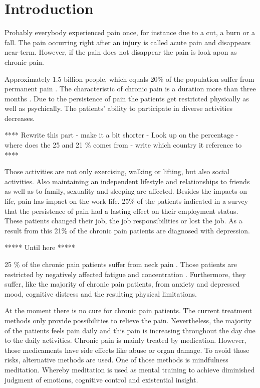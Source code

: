 \chapter{Introduction}

Probably everybody experienced pain once, for instance due to a cut, a burn or a fall. The pain occurring right after an injury is called acute pain and disappears near-term. However, if the pain does not disappear the pain is look apon as chronic pain. \cite{Briggs2010,Mello2016}

Approximately 1.5 billion people, which equals 20\% of the population suffer from permanent pain \cite{Zeidan2016,Macfarlanea2016}. The characteristic of chronic pain is a duration more than three months \cite{Mello2016}. Due to the persistence of pain the patients get restricted physically as well as psychically. 
The patients' ability to participate in diverse activities decreases. 

**** Rewrite this part - make it a bit shorter - Look up on the percentage - where does the 25 and 21 \% comes from - write which country it reference to ****
 
Those activities are not only exercising, walking or lifting, but also social activities. Also maintaining an independent lifestyle and relationships to friends as well as to family, sexuality and sleeping are affected. Besides the impacts on life, pain has impact on the work life. 25\% of the patients indicated in a survey that the persistence of pain had a lasting effect on their employment status. These patients changed their job, the job responsibilities or lost the job. 
As a result from this 21\% of the chronic pain patients are diagnosed with depression. \cite{Breivik2006} 

***** Until here *****

25 \% of the chronic pain patients suffer from neck pain \cite{Macfarlanea2016}. Those patients are restricted by negatively affected fatigue and concentration \cite{vanRanderaat2016}. Furthermore, they suffer, like the majority of chronic pain patients, from anxiety and depressed mood, cognitive distress and the resulting physical limitations. \cite{gross2013}

At the moment there is no cure for chronic pain patients. The current treatment methods only provide possibilities to relieve the pain. \cite{marcus2009,pope2017} Nevertheless, the majority of the patients feels pain daily and this pain is increasing throughout the day due to the daily activities. \cite{Breivik2006}
Chronic pain is mainly treated by medication. However, those medicaments have side effects like abuse or organ damage. To avoid those risks, alternative methods are used. One of those methods is mindfulness meditation. Whereby meditation is used as mental training to achieve diminished judgment of emotions, cognitive control and existential insight. \cite{Zeidan2012}

